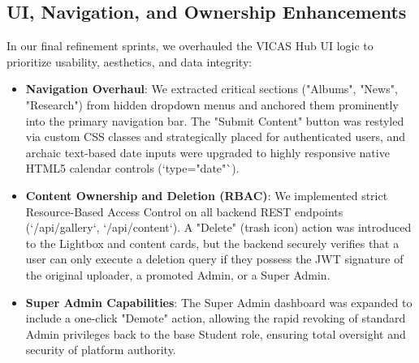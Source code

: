 \documentclass[12pt,a4paper]{report}
\begin{document}
\subsection{UI, Navigation, and Ownership Enhancements}
In our final refinement sprints, we overhauled the VICAS Hub UI logic to prioritize usability, aesthetics, and data integrity:
\begin{itemize}
    \item \textbf{Navigation Overhaul}: We extracted critical sections ("Albums", "News", "Research") from hidden dropdown menus and anchored them prominently into the primary navigation bar. The "Submit Content" button was restyled via custom CSS classes and strategically placed for authenticated users, and archaic text-based date inputs were upgraded to highly responsive native HTML5 calendar controls (`type="date"`).
    \item \textbf{Content Ownership and Deletion (RBAC)}: We implemented strict Resource-Based Access Control on all backend REST endpoints (`/api/gallery`, `/api/content`). A "Delete" (trash icon) action was introduced to the Lightbox and content cards, but the backend securely verifies that a user can only execute a deletion query if they possess the JWT signature of the original uploader, a promoted Admin, or a Super Admin.
    \item \textbf{Super Admin Capabilities}: The Super Admin dashboard was expanded to include a one-click "Demote" action, allowing the rapid revoking of standard Admin privileges back to the base Student role, ensuring total oversight and security of platform authority.
\end{itemize}
\end{document}
